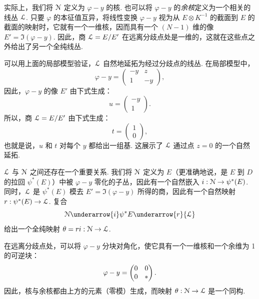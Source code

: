 实际上，我们将 ${\cal N}$ 定义为 $\varphi-y$ 的核. 也可以将 $\varphi-y$ 的{\it 余核}定义为一个相关的线丛 ${\cal L}$. 只要 $\varphi$ 的本征值互异，将线性变换 $\varphi-y$ 视为从 $E\otimes K^{-1}$ 的截面到 $E$ 的截面的映射时，它就有一个一维核，因而具有一个 $(N-1)$ 维的像 $E'=\Im(\varphi-y)$. 因此，商 ${\cal L}=E/E'$ 在远离分歧点处是一维的，这就在这些点之外给出了另一个全纯线丛.

可以用上面的局部模型验证，${\cal L}$ 自然地延拓为经过分歧点的线丛. 在局部模型中，
\begin{equation}
\label{tygor}
\varphi-y=\begin{pmatrix}-y & z \\
1 & -y\end{pmatrix},
\end{equation}
因此，$\varphi-y$ 的像 $E'$ 由下式生成：
\begin{equation}
\label{defu}
u=\begin{pmatrix}-y \\ 1\end{pmatrix}.
\end{equation}
所以，商 ${\cal L}=E/E'$ 由下式生成：
\begin{equation}
\label{timely}
t=\begin{pmatrix}1\\ 0\end{pmatrix},
\end{equation}
也就是说，$u$ 和 $t$ 对每个 $y$ 都给出一组基. 这展示了 ${\cal L}$ 通过点 $z=0$ 的一个自然延拓.

${\cal L}$ 与 ${\cal N}$ 之间还存在一个重要关系. 我们将 ${\cal N}$ 定义为 $E$（更准确地说，是 $E$ 到 $D$ 的拉回 $\psi^*(E)$）中被 $\varphi-y$ 零化的子丛，因此有一个自然嵌入 $i:{\cal N}\to \psi^*(E)$. 同时，${\cal L}$ 是 $\psi^*(E)$ 模去 $E'=\Im(\varphi-y)$ 所得的商，因此有一个自然映射 $r:\psi^*(E)\to {\cal L}$. 复合
\begin{equation}
\label{huty}
{\cal N}\underarrow{i} \psi^*E\underarrow{r} {\cal L}
\end{equation}
给出一个全纯映射 $\theta=ri:{\cal N}\to {\cal L}$.

在远离分歧点处，可以将 $\varphi-y$ 分块对角化，使它具有一个一维核和一个余维为 1 的可逆块：
\begin{equation}\label{zelbo}\varphi-y=\begin{pmatrix} 0 & 0\cr 0&*\end{pmatrix}.\end{equation}
因此，核与余核都由上方的元素（零模）生成，而映射 $\theta:\cal N\to \cal L$ 是一个同构.

